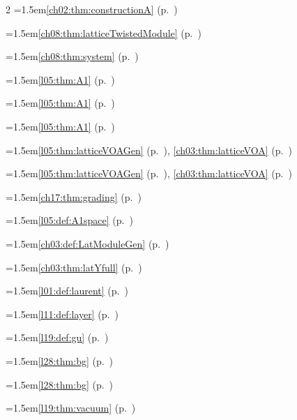 \begin{multicols}{2}
\hangindent=1.5em\quad \ref{ch02:thm:constructionA} (p.~\pageref{ch02:thm:constructionA})\par
\hangindent=1.5em\quad \ref{ch08:thm:latticeTwistedModule} (p.~\pageref{ch08:thm:latticeTwistedModule})\par
\hangindent=1.5em\quad \ref{ch08:thm:system} (p.~\pageref{ch08:thm:system})\par
\hangindent=1.5em\quad \ref{l05:thm:A1} (p.~\pageref{l05:thm:A1})\par
\hangindent=1.5em\quad \ref{l05:thm:A1} (p.~\pageref{l05:thm:A1})\par
\hangindent=1.5em\quad \ref{l05:thm:A1} (p.~\pageref{l05:thm:A1})\par
\hangindent=1.5em\quad \ref{l05:thm:latticeVOAGen} (p.~\pageref{l05:thm:latticeVOAGen}), \ref{ch03:thm:latticeVOA} (p.~\pageref{ch03:thm:latticeVOA})\par
\hangindent=1.5em\quad \ref{l05:thm:latticeVOAGen} (p.~\pageref{l05:thm:latticeVOAGen}), \ref{ch03:thm:latticeVOA} (p.~\pageref{ch03:thm:latticeVOA})\par
\hangindent=1.5em\quad \ref{ch17:thm:grading} (p.~\pageref{ch17:thm:grading})\par
\hangindent=1.5em\quad \ref{l05:def:A1space} (p.~\pageref{l05:def:A1space})\par
\hangindent=1.5em\quad \ref{ch03:def:LatModuleGen} (p.~\pageref{ch03:def:LatModuleGen})\par
\hangindent=1.5em\quad \ref{ch03:thm:latYfull} (p.~\pageref{ch03:thm:latYfull})\par
\hangindent=1.5em\quad \ref{l01:def:laurent} (p.~\pageref{l01:def:laurent})\par
\hangindent=1.5em\quad \ref{l11:def:layer} (p.~\pageref{l11:def:layer})\par
\hangindent=1.5em\quad \ref{l19:def:gu} (p.~\pageref{l19:def:gu})\par
\hangindent=1.5em\quad \ref{l28:thm:bg} (p.~\pageref{l28:thm:bg})\par
\hangindent=1.5em\quad \ref{l28:thm:bg} (p.~\pageref{l28:thm:bg})\par
\hangindent=1.5em\quad \ref{l19:thm:vacuum} (p.~\pageref{l19:thm:vacuum})\par

\end{multicols}
